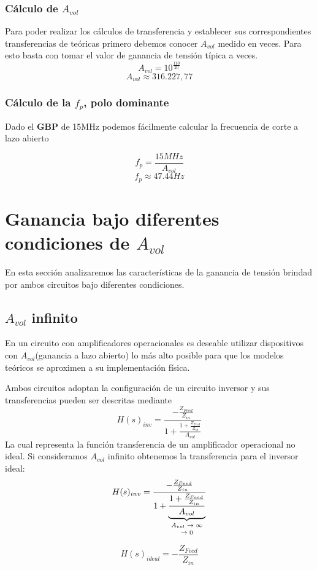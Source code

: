  \subsubsection{Cálculo de $A_{vol}$}
Para poder realizar los cálculos de transferencia y establecer sus correspondientes transferencias de teóricas primero debemos conocer $A_{vol}$ medido en veces. Para esto basta con tomar el valor de ganancia de tensión típica a veces.
$$A_{vol} = 10^{\frac{110}{20}}$$
$$A_{vol} \approx 316.227,77$$

\subsubsection{Cálculo de  la $f_p$, polo dominante}

Dado el \textbf{GBP} de 15MHz podemos fácilmente calcular la frecuencia de corte a lazo abierto

$$ f_p = \frac{15MHz}{A_{vol}} $$
$$ f_p \approx 47.44Hz$$

\section{Ganancia bajo diferentes condiciones de $A_{vol}$}
En esta sección analizaremos las características de la ganancia de tensión brindad por ambos circuitos bajo diferentes condiciones.

\subsection{$A_{vol}$ infinito}
En un circuito con amplificadores operacionales es deseable utilizar dispositivos con $A_{vol}$(ganancia a lazo abierto) lo más alto posible para que los modelos teóricos se aproximen a su implementación física.

Ambos circuitos adoptan la configuración de un circuito inversor y sus transferencias pueden ser descritas mediante
$$H(s)_{inv} = \frac{-\frac{Z_{Feed}}{Z_{in}}}
{1+\frac{1+\frac{Z_{Feed}}{Z_{in}}}{A_{vol}}} $$
La cual representa la función transferencia de un amplificador operacional no ideal.
Si consideramos $A_{vol}$ infinito obtenemos la transferencia para el inversor ideal:
$$H(s)_{inv} = \frac{-\frac{Z_{Feed}}{Z_{in}}}
				{1+\underbrace{\frac{1+\frac{Z_{Feed}}{Z_{in}}}{A_{vol}}}_{\text{\shortstack{$A_{vol}\rightarrow \infty$ \\ $\rightarrow 0$}}}}$$

$$H(s)_{ideal} =  -\frac{Z_{Feed}}{Z_{in}}$$

